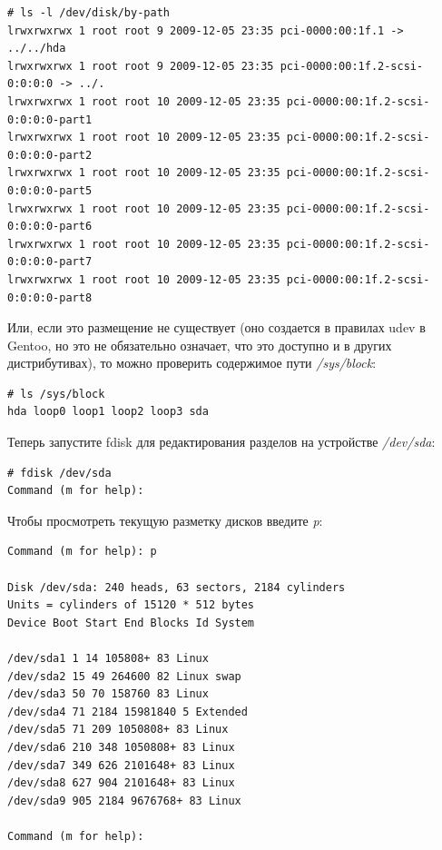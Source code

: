 \documentclass[10pt]{book}
\begin{document}
\begin{tcolorbox} 
\begin{lstlisting}
# ls -l /dev/disk/by-path
lrwxrwxrwx 1 root root 9 2009-12-05 23:35 pci-0000:00:1f.1 -> ../../hda 
lrwxrwxrwx 1 root root 9 2009-12-05 23:35 pci-0000:00:1f.2-scsi-0:0:0:0 -> ../.
lrwxrwxrwx 1 root root 10 2009-12-05 23:35 pci-0000:00:1f.2-scsi-0:0:0:0-part1
lrwxrwxrwx 1 root root 10 2009-12-05 23:35 pci-0000:00:1f.2-scsi-0:0:0:0-part2
lrwxrwxrwx 1 root root 10 2009-12-05 23:35 pci-0000:00:1f.2-scsi-0:0:0:0-part5
lrwxrwxrwx 1 root root 10 2009-12-05 23:35 pci-0000:00:1f.2-scsi-0:0:0:0-part6
lrwxrwxrwx 1 root root 10 2009-12-05 23:35 pci-0000:00:1f.2-scsi-0:0:0:0-part7
lrwxrwxrwx 1 root root 10 2009-12-05 23:35 pci-0000:00:1f.2-scsi-0:0:0:0-part8
\end{lstlisting}
\end{tcolorbox}

Или, если это размещение не существует (оно создается в правилах udev в Gentoo, но это не обязательно означает, что это доступно и в других дистрибутивах), то можно проверить содержимое пути \textit{/sys/block}:

\begin{tcolorbox} 
\begin{lstlisting}
# ls /sys/block
hda loop0 loop1 loop2 loop3 sda
\end{lstlisting}
\end{tcolorbox}
Теперь запустите fdisk для редактирования разделов на устройстве \textit{/dev/sda}:

\begin{tcolorbox} 
\begin{lstlisting}
# fdisk /dev/sda
Command (m for help):
\end{lstlisting}
\end{tcolorbox}

Чтобы просмотреть текущую разметку дисков введите \textit{p}:

\begin{tcolorbox} 
\begin{lstlisting}
Command (m for help): p

Disk /dev/sda: 240 heads, 63 sectors, 2184 cylinders
Units = cylinders of 15120 * 512 bytes
Device Boot Start End Blocks Id System

/dev/sda1 1 14 105808+ 83 Linux
/dev/sda2 15 49 264600 82 Linux swap
/dev/sda3 50 70 158760 83 Linux
/dev/sda4 71 2184 15981840 5 Extended
/dev/sda5 71 209 1050808+ 83 Linux
/dev/sda6 210 348 1050808+ 83 Linux
/dev/sda7 349 626 2101648+ 83 Linux
/dev/sda8 627 904 2101648+ 83 Linux
/dev/sda9 905 2184 9676768+ 83 Linux

Command (m for help):
\end{lstlisting}
\end{tcolorbox}
\end{document}
